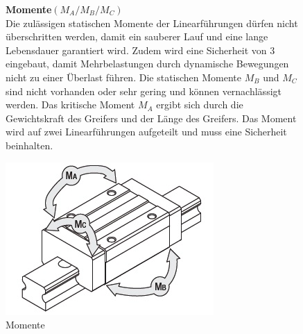 \begin{itemize}








 
\begin{figure}[htbp]
	\hspace{10mm}
	\begin{minipage}[c]{0.5\textwidth} 
	
	
\item \textbf{Momente$(M_A/M_B/M_C)$}	\\
\newline
Die zulässigen statischen Momente der Linearführungen dürfen nicht überschritten werden, damit ein sauberer Lauf und eine lange Lebensdauer garantiert wird. Zudem wird eine Sicherheit von 3 eingebaut, damit Mehrbelastungen durch
dynamische Bewegungen nicht zu einer Überlast führen. Die statischen Momente $M_B$ und $M_C$ sind nicht vorhanden oder sehr gering und können vernachlässigt werden. Das kritische Moment $M_A$ ergibt sich durch die Gewichtskraft des Greifers und der Länge des Greifers. Das Moment wird auf zwei Linearführungen aufgeteilt und muss eine Sicherheit beinhalten.
	\end{minipage}
	\hfill
	\begin{minipage}[c]{0.4\textwidth}
	\includegraphics[width=\textwidth]{Bilder/Momente.jpg}
	\caption{Momente}
	\end{minipage}


\end{figure}
\end{itemize}
